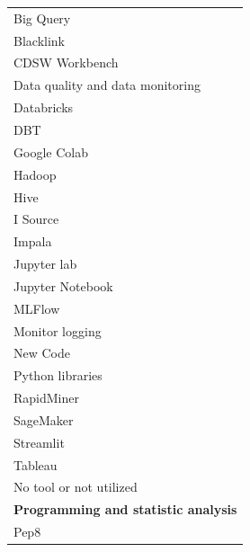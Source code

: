 \documentclass[11pt]{article}
\begin{document}
\begin{longtable}{@{}p{15cm}@{}}
\hspace*{4.5em}Big Query \\
\hspace*{4.5em}Blacklink \\
\hspace*{4.5em}CDSW Workbench \\
\hspace*{4.5em}Data quality and data monitoring \\
\hspace*{4.5em}Databricks \\
\hspace*{4.5em}DBT \\
\hspace*{4.5em}Google Colab \\
\hspace*{4.5em}Hadoop \\
\hspace*{4.5em}Hive \\
\hspace*{4.5em}I Source \\
\hspace*{4.5em}Impala \\
\hspace*{4.5em}Jupyter lab \\
\hspace*{4.5em}Jupyter Notebook \\
\hspace*{4.5em}MLFlow \\
\hspace*{4.5em}Monitor logging \\
\hspace*{4.5em}New Code \\
\hspace*{4.5em}Python libraries \\
\hspace*{4.5em}RapidMiner \\
\hspace*{4.5em}SageMaker \\
\hspace*{4.5em}Streamlit \\
\hspace*{4.5em}Tableau \\
\hspace*{3.0em}No tool or not utilized \\
\hspace*{3.0em}\textbf{Programming and statistic analysis} \\
\hspace*{4.5em}Pep8 \\

\end{longtable}
\end{document}
